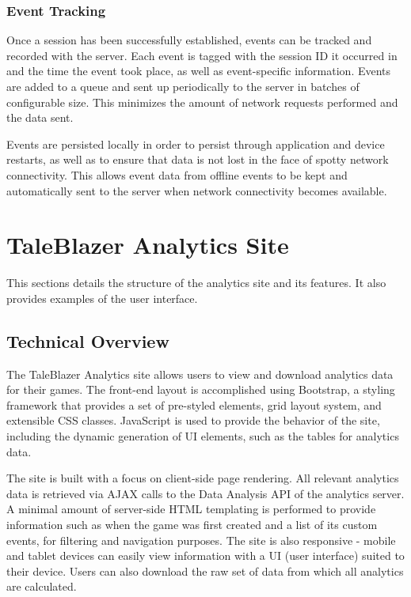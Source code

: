 \subsubsection{Event Tracking}

Once a session has been successfully established, events can be tracked and recorded with the server. Each event is tagged with the session ID it occurred in and the time the event took place, as well as event-specific information. Events are added to a queue and sent up periodically to the server in batches of configurable size. This minimizes the amount of network requests performed and the data sent.

Events are persisted locally in order to persist through application and device restarts, as well as to ensure that data is not lost in the face of spotty network connectivity. This allows event data from offline events to be kept and automatically sent to the server when network connectivity becomes available.
\pagebreak

\section{TaleBlazer Analytics Site}

This sections details the structure of the analytics site and its features. It also provides examples of the user interface. 

\subsection{Technical Overview}

The TaleBlazer Analytics site allows users to view and download analytics data for their games. The front-end layout is accomplished using Bootstrap, a styling framework that provides a set of pre-styled elements, grid layout system, and extensible CSS classes. JavaScript is used to provide the behavior of the site, including the dynamic generation of UI elements, such as the tables for analytics data. 

The site is built with a focus on client-side page rendering. All relevant analytics data is retrieved via AJAX calls to the Data Analysis API of the analytics server. A minimal amount of server-side HTML templating is performed to provide information such as when the game was first created and a list of its custom events, for filtering and navigation purposes. The site is also responsive - mobile and tablet devices can easily view information with a UI (user interface) suited to their device. Users can also download the raw set of data from which all analytics are calculated.

